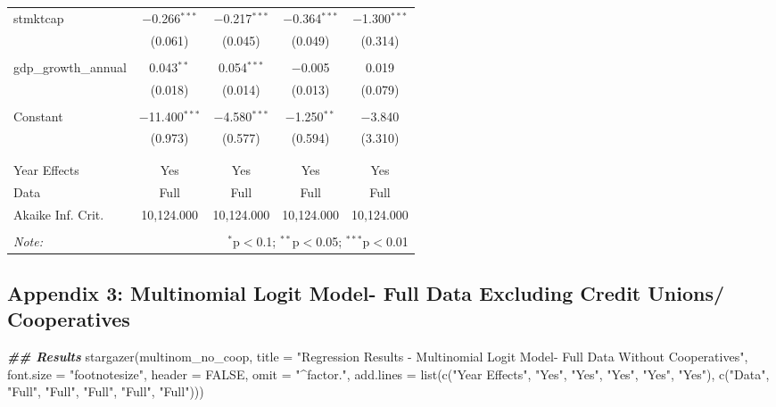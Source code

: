 \documentclass[a4paper,nobind]{templates/ociamthesis}
\newenvironment{Shaded}{\begin{snugshade}}{\end{snugshade}}
\newcommand{\AttributeTok}[1]{\textcolor[rgb]{0.77,0.63,0.00}{#1}}
\newcommand{\ConstantTok}[1]{\textcolor[rgb]{0.00,0.00,0.00}{#1}}
\newcommand{\DocumentationTok}[1]{\textcolor[rgb]{0.56,0.35,0.01}{\textbf{\textit{#1}}}}
\newcommand{\FunctionTok}[1]{\textcolor[rgb]{0.00,0.00,0.00}{#1}}
\newcommand{\NormalTok}[1]{#1}
\newcommand{\StringTok}[1]{\textcolor[rgb]{0.31,0.60,0.02}{#1}}
\renewenvironment{Shaded}
{
  \vspace{10pt}%
  \begin{snugshade}%
}{%
  \end{snugshade}%
  \vspace{8pt}%
}
\begin{document}
\begin{table}[!htbp]
\begin{tabular}{@{\extracolsep{5pt}}lcccc}
 stmktcap & $-$0.266$^{***}$ & $-$0.217$^{***}$ & $-$0.364$^{***}$ & $-$1.300$^{***}$ \\ 
  & (0.061) & (0.045) & (0.049) & (0.314) \\ 
  & & & & \\ 
 gdp\_growth\_annual & 0.043$^{**}$ & 0.054$^{***}$ & $-$0.005 & 0.019 \\ 
  & (0.018) & (0.014) & (0.013) & (0.079) \\ 
  & & & & \\ 
 Constant & $-$11.400$^{***}$ & $-$4.580$^{***}$ & $-$1.250$^{**}$ & $-$3.840 \\ 
  & (0.973) & (0.577) & (0.594) & (3.310) \\ 
  & & & & \\ 
\hline \\[-1.8ex] 
Year Effects & Yes & Yes & Yes & Yes \\ 
Data & Full & Full & Full & Full \\ 
Akaike Inf. Crit. & 10,124.000 & 10,124.000 & 10,124.000 & 10,124.000 \\ 
\hline 
\hline \\[-1.8ex] 
\textit{Note:}  & \multicolumn{4}{r}{$^{*}$p$<$0.1; $^{**}$p$<$0.05; $^{***}$p$<$0.01} \\ 
\end{tabular} 
\end{table}

\newpage

\hypertarget{appendix-3-multinomial-logit-model--full-data-excluding-credit-unions-cooperatives}{%
\subsection{Appendix 3: Multinomial Logit Model- Full Data Excluding Credit Unions/ Cooperatives}\label{appendix-3-multinomial-logit-model--full-data-excluding-credit-unions-cooperatives}}

\begin{Shaded}
\begin{Highlighting}[]
\DocumentationTok{\#\# Results }
\FunctionTok{stargazer}\NormalTok{(multinom\_no\_coop, }\AttributeTok{title =} \StringTok{"Regression Results {-} Multinomial Logit Model{-} Full Data Without Cooperatives"}\NormalTok{, }\AttributeTok{font.size =} \StringTok{"footnotesize"}\NormalTok{, }\AttributeTok{header =} \ConstantTok{FALSE}\NormalTok{, }\AttributeTok{omit =} \StringTok{"\^{}factor."}\NormalTok{, }\AttributeTok{add.lines =} \FunctionTok{list}\NormalTok{(}\FunctionTok{c}\NormalTok{(}\StringTok{"Year Effects"}\NormalTok{, }\StringTok{"Yes"}\NormalTok{, }\StringTok{"Yes"}\NormalTok{, }\StringTok{"Yes"}\NormalTok{, }\StringTok{"Yes"}\NormalTok{, }\StringTok{"Yes"}\NormalTok{), }\FunctionTok{c}\NormalTok{(}\StringTok{"Data"}\NormalTok{, }\StringTok{"Full"}\NormalTok{, }\StringTok{"Full"}\NormalTok{, }\StringTok{"Full"}\NormalTok{, }\StringTok{"Full"}\NormalTok{, }\StringTok{"Full"}\NormalTok{)))}
\end{Highlighting}
\end{Shaded}
\end{document}

